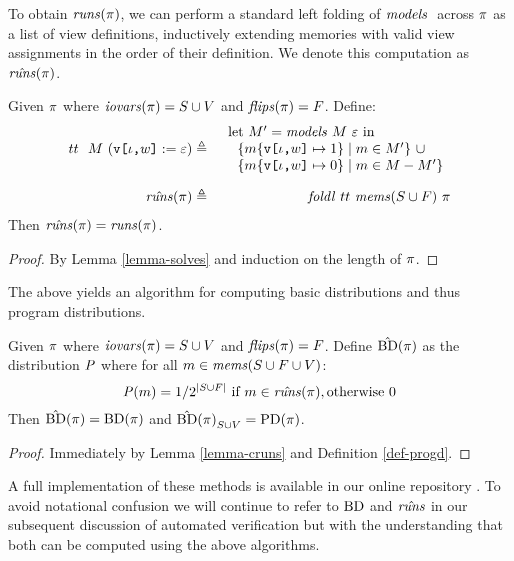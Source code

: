 To obtain $\mathit{runs}(\pi)$, we can perform a standard left folding of $\mathit{models}\ \!\ \!$
across $\pi$ as a list of view definitions, inductively extending
memories with valid view assignments in the order of their definition.
We denote this computation as $\hat{\mathit{runs}}(\pi)$.
\begin{lemma}
  \label{lemma-cruns}
  Given $\pi$ where $\mathit{iovars}(\pi) = S \cup V$ and $\mathit{flips}(\pi) = F$. Define:
  \begin{eqnarray*}
    {tt}\ \ M\ (\texttt{v[}\iota\texttt{,}w\texttt{]} := \varepsilon) &\triangleq& \begin{array}{l}
      \mathrm{let}\ M' = \mathit{models}\ M\ \varepsilon \ \mathrm{in}\\
      \ \ \{m\{\texttt{v[}\iota\texttt{,}w\texttt{]} \mapsto 1\} \mid m \in M' \}\ \cup\\
      \ \ \{m\{\texttt{v[}\iota\texttt{,}w\texttt{]} \mapsto 0\} \mid m \in M - M' \}\end{array}\\[2mm]
    \hat{\mathit{runs}}(\pi) &\triangleq& \mathit{foldl}\ {tt}\ \mathit{mems}(S \cup F)\ \pi
  \end{eqnarray*}
  Then $\hat{\mathit{runs}}(\pi) = \mathit{runs}(\pi)$.
\end{lemma}
\begin{proof}
  By Lemma \ref{lemma-solves} and induction on the length of $\pi$. 
\end{proof}
The above yields an algorithm for computing basic distributions and
thus program distributions. 
\begin{lemma}
  \label{lemma-cprogtt}
  Given $\pi$ where $\mathit{iovars}(\pi) = S \cup V$ and $\mathit{flips}(\pi) = F$. Define
  $\hat{\mathrm{BD}}(\pi)$ as the distribution $\mathit{P}$
  where for all $m \in \mathit{mems}(S\cup F \cup V)$:
  $$
  \mathit{P}(m) = 1 / 2^{|S\cup F|} \ \text{if}\ m \in \hat{\mathit{runs}}(\pi), \text{otherwise}\ 0
  $$
  Then $\hat{\mathrm{BD}}(\pi) = \mathrm{BD}(\pi)$ and ${\hat{\mathrm{BD}}(\pi)}_{S\cup V} = \mathrm{PD}(\pi)$.
\end{lemma}
\begin{proof}
  Immediately by Lemma \ref{lemma-cruns} and Definition \ref{def-progd}.
\end{proof}
A full implementation of these methods is available in our online
repository \cite{jpdf-github}. To
avoid notational confusion we will continue to refer to $\mathrm{BD}$ and
$\hat{\mathit{runs}}$ in our subsequent discussion of automated verification but
with the understanding that both can be computed using the above
algorithms.


